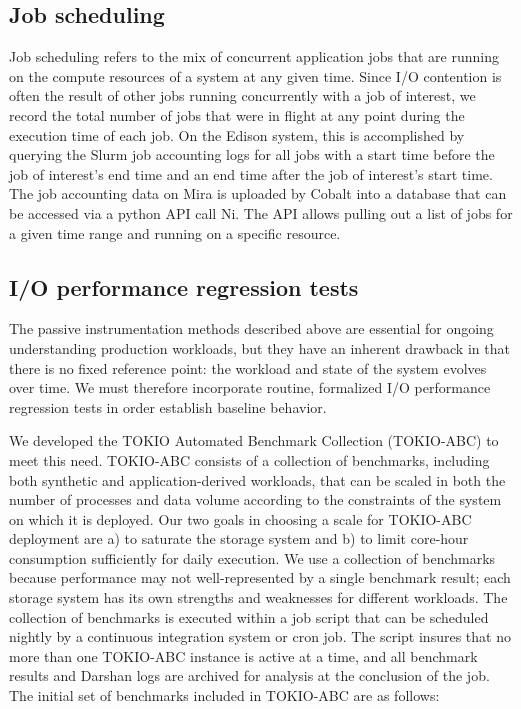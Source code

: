 \subsection{Job scheduling }

Job scheduling refers to the mix of concurrent application jobs that are running on the compute resources of a system at any given time.
Since I/O contention is often the result of other jobs running concurrently with a job of interest, we record the total number of jobs that were in flight at any point during the execution time of each job.
On the Edison system, this is accomplished by querying the Slurm job accounting logs for all jobs with a start time before the job of interest's end time and an end time after the job of interest's start time.
The job accounting data on Mira is uploaded by Cobalt into a database that can
be accessed via a python API call Ni. The API allows pulling out a list of
jobs for a given time range and running on a specific resource.

\subsection{I/O performance regression tests} \label{sec:methods/tests}

The passive instrumentation methods described above are essential for
ongoing understanding production workloads, but they have an inherent
drawback in that there is no fixed reference point: the workload
and state of the system evolves over time.  We must therefore incorporate
routine, formalized I/O performance regression tests in order establish baseline behavior.

We developed the TOKIO Automated Benchmark Collection (TOKIO-ABC) to meet
this need.  TOKIO-ABC consists of a collection of benchmarks, including
both synthetic and application-derived workloads, that can be scaled in
both the number of processes and data volume according to the constraints
of the system on which it is deployed. Our two goals in choosing a scale
for TOKIO-ABC deployment are a) to saturate the storage system and b)
to limit core-hour consumption sufficiently for daily execution.  We use
a collection of benchmarks because performance may not well-represented
by a single benchmark result; each storage system has its own strengths
and weaknesses for different workloads.  The collection of benchmarks is
executed within a job script that can be scheduled nightly by a continuous
integration system or cron job.  The script insures that no more than
one TOKIO-ABC instance is active at a time, and all benchmark results
and Darshan logs are archived for analysis at the conclusion of the job.
The initial set of benchmarks included in TOKIO-ABC are as follows:

